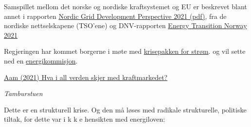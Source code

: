 \documentclass[
]{book}
\begin{document}
Samspillet mellom det norske og nordiske kraftsystemet og EU er beskrevet blant annet i rapporten \href{https://www.statnett.no/globalassets/for-aktorer-i-kraftsystemet/planer-og-analyser/nordic-grid-development-perspective-2021.pdf}{Nordic Grid Development Perspective 2021 (pdf)}, fra de nordiske nettselskapene (TSO'ene) og DNV-rapporten \href{https://www.dnv.com/Publications/energy-transition-norway-2021-212201}{Energy Transition Norway 2021}

Regjeringen har kommet borgerne i møte med \href{https://www.nrk.no/norge/regjeringen-med-pressekonferanse-om-stromsituasjonen-1.15728336}{krisepakken for strøm}.
og vil sette ned en \href{https://www.regjeringen.no/no/aktuelt/energiforskningskonferansen/id2879520/}{energikommisjon}.

\href{https://blogg.sintef.no/sintefenergy-nb/hva-i-all-verden-skjer-med-kraftmarkedet/}{Aam (2021) Hva i all verden skjer med kraftmarkedet?}

\emph{Tamburstuen}

Dette er en strukturell krise. Og den må løses med radikale strukturelle, politiske tiltak, for dette var i k k e hensikten med energiloven:
\end{document}
